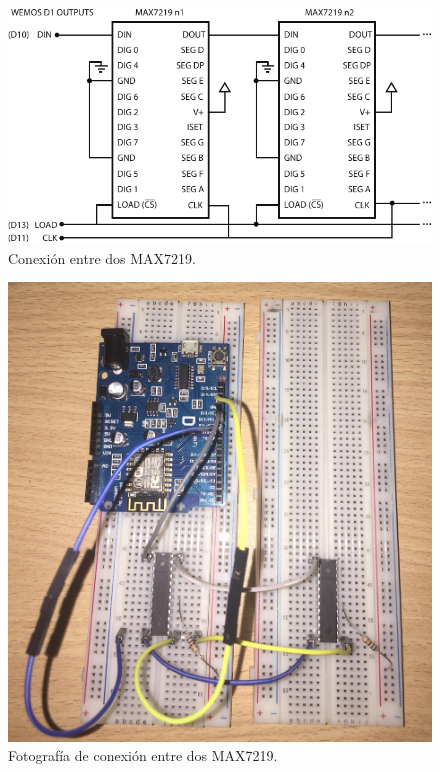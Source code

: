     \begin{figure}[ht!]
        \centering
        \begin{center}
            \includegraphics[width=\textwidth]{imagenes/hw-conexiones/MAX-daisychain.pdf}
            \caption{Conexión entre dos MAX7219.}
            \label{fig:MAX-MAX}
        \end{center}
    \end{figure}
    
    \begin{figure}[ht!]
        \centering
        \begin{center}
            \includegraphics[width=1\textwidth]{imagenes/hw-conexiones/conexion-MAX-MAX.JPG}
            \caption{Fotografía de conexión entre dos MAX7219.}
            \label{fig:MAX-MAX-real}
        \end{center}
    \end{figure}


